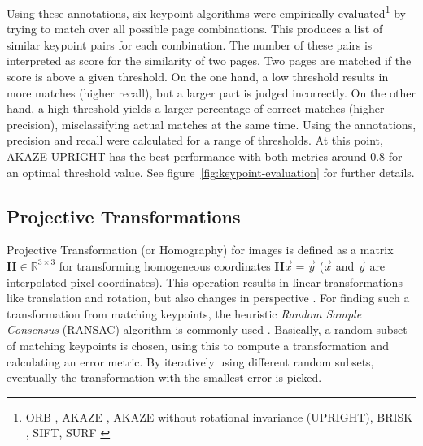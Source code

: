 \documentclass{ltjarticle}
\begin{document}
Using these annotations, six keypoint algorithms were empirically evaluated\footnote{ORB \cite{rublee2011orb}, AKAZE \cite{alcantarilla2011fast}, AKAZE without rotational invariance (UPRIGHT), BRISK \cite{leutenegger2011brisk}, SIFT, SURF \cite{bay2006surf}} by trying to match over all possible page combinations. This produces a list of similar keypoint pairs for each combination. The number of these pairs is interpreted as score for the similarity of two pages. Two pages are matched if the score is above a given threshold. On the one hand, a low threshold results in more matches (higher recall), but a larger part is judged incorrectly. On the other hand, a high threshold yields a larger percentage of correct matches (higher precision), misclassifying actual matches at the same time. Using the annotations, precision and recall were calculated for a range of thresholds. At this point, AKAZE UPRIGHT has the best performance with both metrics around $0.8$ for an optimal threshold value. See figure~\ref{fig:keypoint-evaluation} for further details.

\subsection{Projective Transformations}

Projective Transformation (or Homography) for images is defined as a matrix $\mathbf{H} \in \mathbb{R}^{3 \times 3}$ for transforming homogeneous coordinates $\mathbf{H}\vec{x} = \vec{y}$ ($\vec{x}$ and $\vec{y}$ are interpolated pixel coordinates). This operation results in linear transformations like translation and rotation, but also changes in perspective \cite{marschner2015fundamentals}. For finding such a transformation from matching keypoints, the heuristic \emph{Random Sample Consensus} (RANSAC) algorithm is commonly used \cite{fischler1981random}. Basically, a random subset of matching keypoints is chosen, using this to compute a transformation and calculating an error metric. By iteratively using different random subsets, eventually the transformation with the smallest error is picked.
\end{document}
